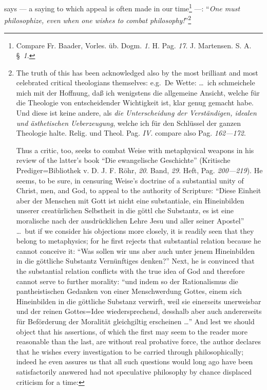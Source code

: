 \documentclass[12pt]{book}
\begin{document}
says --- a saying to which appeal is often made in our time\footnote{Compare
Fr. Baader, Vorles. üb. Dogm. \textit{1}. H. Pag. \textit{17}. J. Martensen.
S. A. §~\textit{1}.} ---: ``\emph{One must philosophize, even when one wishes
to combat philosophy!}''\footnote{The truth of this has been acknowledged
also by the most brilliant and most celebrated critical theologians
themselves: e.g.\ De Wette: \ldots\ ich schmeichele mich mit der Hoffnung,
daß ich wenigstens die allgemeine Ansicht, welche für die Theologie von
entscheidender Wichtigkeit ist, klar genug gemacht habe. Und diese ist keine
andere, als \emph{die Unterscheidung der Verständigen, idealen und
ästhetischen Ueberzeugung}, welche ich für den Schlüssel der ganzen Theologie
halte. Relig. und Theol. Pag. \textit{IV}. compare also Pag.
\textit{162---172}.

Thus a critic, too, seeks to combat Weise with metaphysical weapons in his
review of the latter's book ``Die ewangelische Geschichte'' (Kritische
Prediger=Bibliothek v. D. J. F. Röhr, \textit{20}. Band, \textit{29}. Heft,
Pag. \textit{200---219}). He seems, to be sure, in censuring Weise's doctrine
of a substantial unity of Christ, men, and God, to appeal to the authority of
Scripture: ``Diese Einheit aber der Menschen mit Gott ist nicht eine
substantiale, ein Hineinbilden unserer creatürlichen Selbstheit in die göttl
che Substantz, es ist eine moralische nach der ausdrücklichen Lehre Jesu und
aller seiner Apostel'' \ldots\ but if we consider his objections more closely,
it is readily seen that they belong to metaphysics; for he first rejects that
substantial relation because he cannot conceive it: ``Was sollen wir uns aber
auch unter jenem Hineinbilden in die göttliche Substantz Vernünftiges
denken?'' Next, he is convinced that the substantial relation conflicts with
the true idea of God and therefore cannot serve to further morality: ``und
indem so der Rationalismus die pantheistischen Gedanken von einer
Menschwerdung Gottes, einem sich Hineinbilden in die göttliche Substanz
verwirft, weil sie einerseits unerweisbar und der reinen Gottes=Idee
wiedersprechend, desshalb aber auch andererseits für Beförderung der Moralität
gleichgiltig erscheinen \ldots'' And lest we should object that his assertions,
of which the first may seem to the reader more reasonable than the last, are
without real probative force, the author declares that he wishes every
investigation to be carried through philosophically; indeed he even assures
us that all such questions would long ago have been satisfactorily answered
had not speculative philosophy by chance displaced criticism for a time:
}
\end{document}
